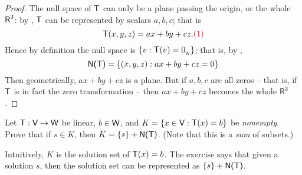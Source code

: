 \begin{proof}
The null space of \(\textsf{T}\) can only be a plane passing the origin, or the whole \(\textsf{R}^3\): by , \(\textsf{T}\) can be represented by scalars \(a, b, c\);
that is
\[
    \T(x, y, z) = ax + by + cz. \MAROON{(1)}
\]
Hence by definition the null space is \(\{ v : \textsf{T}(v) = 0_{_{\textsf{W}}} \}\);
that is, by ,
\[
    \textsf{N(T)} = \{(x, y, z): ax + by + cz = 0\}
\]
Then geometrically, \(ax + by + cz\) is a plane.
But if \(a, b, c\) are all zeros -- that is, if \(\textsf{T}\) is in fact the zero transformation -- then \(ax + by + cz\) becomes the whole \(\textsf{R}^3\).
\end{proof}

\begin{exercise} \label{exercise 2.1.24}
Let \(\textsf{T} : \textsf{V} \to \textsf{W}\) be linear, \(b \in \textsf{W}\), and \(K = \{ x \in \textsf{V} : \textsf{T}(x) = b \}\) be \emph{nonempty}.
Prove that if \(s \in K\), then \(K = \{ s \} + \textsf{N(T)}\). (Note that this is a \emph{sum} of subsets.)
\end{exercise}

\begin{note}
Intuitively, \(K\) is the solution set of \(\textsf{T}(x) = b\).
The exercise says that given a solution \(s\), then the solution set can be represented as \(\{ s \} + \textsf{N(T)}\).
\end{note}

